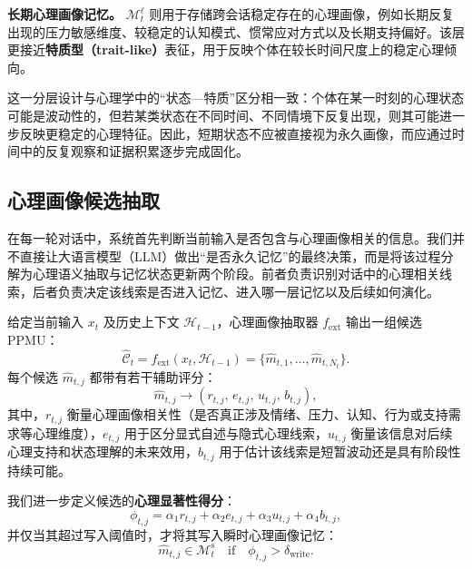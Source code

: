 \documentclass[12pt,a4paper]{article}
\begin{document}
\textbf{长期心理画像记忆。} $\mathcal{M}^{\ell}_t$ 则用于存储跨会话稳定存在的心理画像，例如长期反复出现的压力敏感维度、较稳定的认知模式、惯常应对方式以及长期支持偏好。该层更接近\textbf{特质型（trait-like）}表征，用于反映个体在较长时间尺度上的稳定心理倾向。

这一分层设计与心理学中的``状态—特质''区分相一致：个体在某一时刻的心理状态可能是波动性的，但若某类状态在不同时间、不同情境下反复出现，则其可能进一步反映更稳定的心理特征。因此，短期状态不应被直接视为永久画像，而应通过时间中的反复观察和证据积累逐步完成固化。

\subsection{心理画像候选抽取}

在每一轮对话中，系统首先判断当前输入是否包含与心理画像相关的信息。我们并不直接让大语言模型（LLM）做出``是否永久记忆''的最终决策，而是将该过程分解为心理语义抽取与记忆状态更新两个阶段。前者负责识别对话中的心理相关线索，后者负责决定该线索是否进入记忆、进入哪一层记忆以及后续如何演化。

给定当前输入 $x_t$ 及历史上下文 $\mathcal{H}_{t-1}$，心理画像抽取器 $f_{\text{ext}}$ 输出一组候选 PPMU：
\begin{equation}
\hat{\mathcal{C}}_t = f_{\text{ext}}(x_t, \mathcal{H}_{t-1}) = \{\hat{m}_{t,1}, \dots, \hat{m}_{t,N_t}\}.
\label{eq:extract}
\end{equation}
每个候选 $\hat{m}_{t,j}$ 都带有若干辅助评分：
\begin{equation}
\hat{m}_{t,j} \rightarrow (r_{t,j},\, e_{t,j},\, u_{t,j},\, b_{t,j}),
\label{eq:scores}
\end{equation}
其中，$r_{t,j}$ 衡量心理画像相关性（是否真正涉及情绪、压力、认知、行为或支持需求等心理维度），$e_{t,j}$ 用于区分显式自述与隐式心理线索，$u_{t,j}$ 衡量该信息对后续心理支持和状态理解的未来效用，$b_{t,j}$ 用于估计该线索是短暂波动还是具有阶段性持续可能。

我们进一步定义候选的\textbf{心理显著性得分}：
\begin{equation}
\phi_{t,j} = \alpha_1 r_{t,j} + \alpha_2 e_{t,j} + \alpha_3 u_{t,j} + \alpha_4 b_{t,j},
\label{eq:salience}
\end{equation}
并仅当其超过写入阈值时，才将其写入瞬时心理画像记忆：
\begin{equation}
\hat{m}_{t,j} \in \mathcal{M}^{\text{s}}_t \quad \text{if} \quad \phi_{t,j} > \delta_{\text{write}}.
\label{eq:write}
\end{equation}
\end{document}
